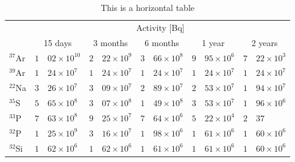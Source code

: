 \documentclass[12pt, a4paper,twoside]{article}
\begin{document}
\begin{table}
	\caption{This is a horizontal table}
	\label{tab:ThisIsAHorizontalTable}
	\centering
      \begin{tabular}{l r @{.} l r @{.} l r @{.} l r @{.} l r @{.} l}
         \toprule
                      &    \multicolumn{ 10}{c}{Activity  $[$Bq$]$ } \\
         \cmidrule(l){2-11}
                      &    \multicolumn{2}{c}{15 days} &   \multicolumn{2}{c}{3 months} &   \multicolumn{2}{c}{6 months} &      \multicolumn{2}{c}{1 year} &    \multicolumn{2}{c}{2 years} \\
         \midrule
         $^{37}$Ar    &   $1$&$02\times 10^{10}$ &  $2$&$22\times 10^{9}$ &   $3$&$66\times 10^{8}$ &   $9$&$95\times 10^{6}$&   $7$&$22\times 10^{3}$ \\                                                                                                                                 
         $^{39}$Ar    &   $1$&$24\times 10^{7 }$ &  $1$&$24\times 10^{7}$ &   $1$&$24\times 10^{7}$ &   $1$&$24\times 10^{7}$&   $1$&$24\times 10^{7}$ \\                                                                                                                                  
         $^{22}$Na    &   $3$&$26\times 10^{7 }$ &  $3$&$09\times 10^{7}$ &   $2$&$89\times 10^{7}$ &   $2$&$53\times 10^{7}$&   $1$&$94\times 10^{7}$ \\                                                                                                                                  
         $^{35}$S     &   $5$&$65\times 10^{8 }$ &  $3$&$07\times 10^{8}$ &   $1$&$49\times 10^{8}$ &   $3$&$53\times 10^{7}$&   $1$&$96\times 10^{6}$ \\                                                                                                                                  
         $^{33}$P     &   $7$&$63\times 10^{8 }$ &  $9$&$25\times 10^{7}$ &   $7$&$64\times 10^{6}$ &   $5$&$22\times 10^{4}$&   $2$&$37$ \\                                                                                                                                   
         $^{32}$P     &   $1$&$25\times 10^{9 }$ &  $3$&$16\times 10^{7}$ &   $1$&$98\times 10^{6}$ &   $1$&$61\times 10^{6}$&   $1$&$60\times 10^{6}$ \\                                                                                                                                
         $^{32}$Si    &   $1$&$62\times 10^{6 }$ &  $1$&$62\times 10^{6}$ &   $1$&$61\times 10^{6}$ &   $1$&$61\times 10^{6}$&   $1$&$60\times 10^{6}$ \\                                                                                                                                  

\end{tabular}
\end{table}
\end{document}
